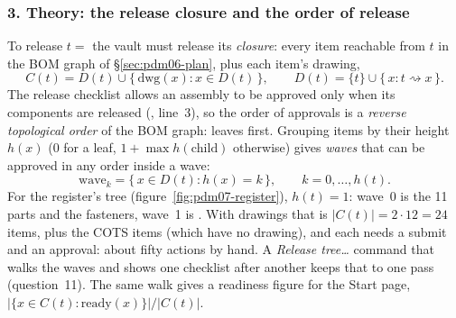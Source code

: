 \subsubsection*{3. Theory: the release closure and the order of release}

To release $t = $  the vault must release its \emph{closure}: every item reachable from $t$ in the BOM
graph of \S\ref{sec:pdm06-plan}, plus each item's drawing,
\[
  C(t) = D(t) \cup \{\,\mathrm{dwg}(x) : x \in D(t)\,\},\qquad D(t) = \{t\} \cup \{\,x : t \rightsquigarrow x\,\}.
\]
The release checklist allows an assembly to be approved only when its components are released (, line~3),
so the order of approvals is a \emph{reverse topological order} of the BOM graph: leaves first. Grouping items by their
height $h(x)$ (0 for a leaf, $1 + \max h(\text{child})$ otherwise) gives \emph{waves} that can be approved in any
order inside a wave:
\[
  \text{wave}_k = \{\,x \in D(t) : h(x) = k\,\},\qquad k = 0, \ldots, h(t).
\]
For the register's tree (figure~\ref{fig:pdm07-register}), $h(t)=1$: wave~0 is the 11 parts and the fasteners, wave~1 is
. With drawings that is $|C(t)| = 2\cdot12 = 24$ items, plus the COTS items (which have no drawing), and
each needs a submit and an approval: about fifty actions by hand. A \emph{Release tree\ldots} command that walks the waves
and shows one checklist after another keeps that to one pass (question~11). The same walk gives a readiness figure for
the Start page, $\lvert\{x \in C(t) : \text{ready}(x)\}\rvert / \lvert C(t)\rvert$.

